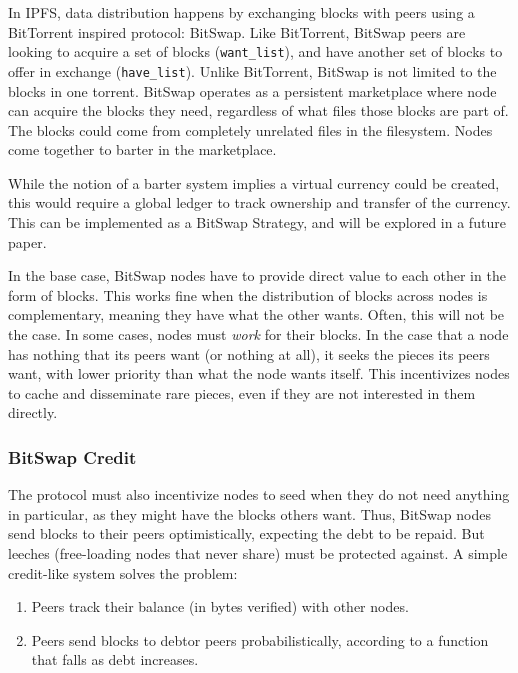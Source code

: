 \documentclass{sig-alternate}
\begin{document}
In IPFS, data distribution happens by exchanging blocks with peers using a
BitTorrent inspired protocol: BitSwap. Like BitTorrent, BitSwap peers are
looking to acquire a set of blocks (\texttt{want\_list}), and have another set
of blocks to offer in exchange (\texttt{have\_list}).
Unlike BitTorrent, BitSwap is not limited to the blocks in one torrent.
BitSwap operates as a persistent marketplace where node can acquire the
blocks they need, regardless of what files those blocks are part of. The
blocks could come from completely unrelated files in the filesystem.
Nodes come together to barter in the marketplace.

While the notion of a barter system implies a virtual currency could be
created, this would require a global ledger to track ownership
and transfer of the currency. This can be implemented as a BitSwap Strategy, and will be explored in a future paper.

In the base case, BitSwap nodes have to provide direct value to each other
in the form of blocks. This works fine when the distribution of blocks across
nodes is complementary, meaning they have what the other wants. Often, this
will not be the case. In some cases, nodes must \textit{work} for their
blocks. In the case that a node has nothing that its peers want (or
nothing at all), it seeks the pieces its peers want, with lower
priority than what the node wants itself. This incentivizes nodes to cache and
disseminate rare pieces, even if they are not interested in them directly.

\subsubsection{BitSwap Credit}

The protocol must also incentivize nodes to seed when they do not need
anything in particular, as they might have the blocks others want. Thus,
BitSwap nodes send blocks to their peers optimistically, expecting the debt to
be repaid. But leeches (free-loading nodes that never share) must be protected against. A simple credit-like system solves the problem:

\begin{enumerate}
  \item Peers track their balance (in bytes verified) with other nodes.
  \item Peers send blocks to debtor peers probabilistically, according to
        a function that falls as debt increases.
\end{enumerate}
\end{document}
